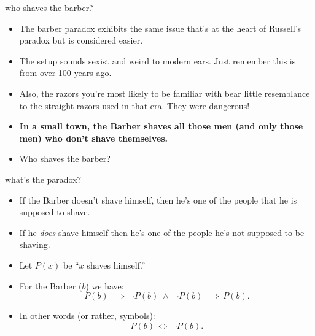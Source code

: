 \documentclass[handout,landscape]{beamer}
\begin{document}
\begin{frame}{who shaves the barber?}
\begin{itemize}
\item The barber paradox exhibits the same issue that's at the heart of Russell's paradox but is considered easier. \pause
\item The setup sounds sexist and weird to modern ears.  Just remember this is from over 100 years ago.  \pause
\item Also, the razors you're most likely to be familiar with bear little resemblance to the straight razors used in that era. They were dangerous! \pause
\item {\bf In a small town, the Barber shaves all those men (and only those men) who don't shave themselves.} \pause
\item Who shaves the barber?
\end{itemize}
\end{frame}

\begin{frame}{what's the paradox?}
\begin{itemize}
\item If the Barber doesn't shave himself, then he's one of the people that he is supposed to shave. \pause
\item If he {\em does} shave himself then he's one of the people he's not supposed to be shaving. \pause
\item Let $P(x)$ be ``$x$ shaves himself.''
\item For the Barber ($b$) we have:
\[ P(b) \, \implies \, \lnot P(b) \; \land \; \lnot P(b) \, \implies \, P(b). \] \pause
\item In other words (or rather, symbols):
\[ P(b) \, \iff \, \lnot P(b). \]
\end{itemize}
\end{frame}
\end{document}
